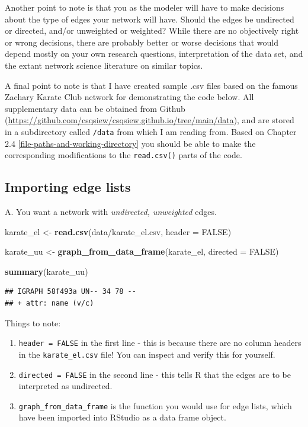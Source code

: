 \documentclass[
]{book}
\newenvironment{Shaded}{\begin{snugshade}}{\end{snugshade}}
\newcommand{\AttributeTok}[1]{\textcolor[rgb]{0.13,0.29,0.53}{#1}}
\newcommand{\ConstantTok}[1]{\textcolor[rgb]{0.56,0.35,0.01}{#1}}
\newcommand{\FunctionTok}[1]{\textcolor[rgb]{0.13,0.29,0.53}{\textbf{#1}}}
\newcommand{\NormalTok}[1]{#1}
\newcommand{\OtherTok}[1]{\textcolor[rgb]{0.56,0.35,0.01}{#1}}
\newcommand{\StringTok}[1]{\textcolor[rgb]{0.31,0.60,0.02}{#1}}
\providecommand{\tightlist}{%
  \setlength{\itemsep}{0pt}\setlength{\parskip}{0pt}}
\begin{document}
Another point to note is that you as the modeler will have to make decisions about the type of edges your network will have. Should the edges be undirected or directed, and/or unweighted or weighted? While there are no objectively right or wrong decisions, there are probably better or worse decisions that would depend mostly on your own research questions, interpretation of the data set, and the extant network science literature on similar topics.

A final point to note is that I have created sample .csv files based on the famous Zachary Karate Club network for demonstrating the code below. All supplementary data can be obtained from Github (\url{https://github.com/csqsiew/csqsiew.github.io/tree/main/data}), and are stored in a subdirectory called \texttt{/data} from which I am reading from. Based on Chapter 2.4 \ref{file-paths-and-working-directory} you should be able to make the corresponding modifications to the \texttt{read.csv()} parts of the code.

\subsection{Importing edge lists}\label{importing-edge-lists}

A. You want a network with \emph{undirected, unweighted} edges.

\begin{Shaded}
\begin{Highlighting}[]
\NormalTok{karate\_el }\OtherTok{\textless{}{-}} \FunctionTok{read.csv}\NormalTok{(}\StringTok{\textquotesingle{}data/karate\_el.csv\textquotesingle{}}\NormalTok{, }\AttributeTok{header =} \ConstantTok{FALSE}\NormalTok{)}

\NormalTok{karate\_uu }\OtherTok{\textless{}{-}} \FunctionTok{graph\_from\_data\_frame}\NormalTok{(karate\_el, }\AttributeTok{directed =} \ConstantTok{FALSE}\NormalTok{)}

\FunctionTok{summary}\NormalTok{(karate\_uu)}
\end{Highlighting}
\end{Shaded}

\begin{verbatim}
## IGRAPH 58f493a UN-- 34 78 -- 
## + attr: name (v/c)
\end{verbatim}

Things to note:

\begin{enumerate}
\def\labelenumi{\arabic{enumi}.}
\tightlist
\item
  \texttt{header\ =\ FALSE} in the first line - this is because there are no column headers in the \texttt{karate\_el.csv} file! You can inspect and verify this for yourself.
\item
  \texttt{directed\ =\ FALSE} in the second line - this tells R that the edges are to be interpreted as undirected.
\item
  \texttt{graph\_from\_data\_frame} is the function you would use for edge lists, which have been imported into RStudio as a data frame object.
\end{enumerate}
\end{document}
